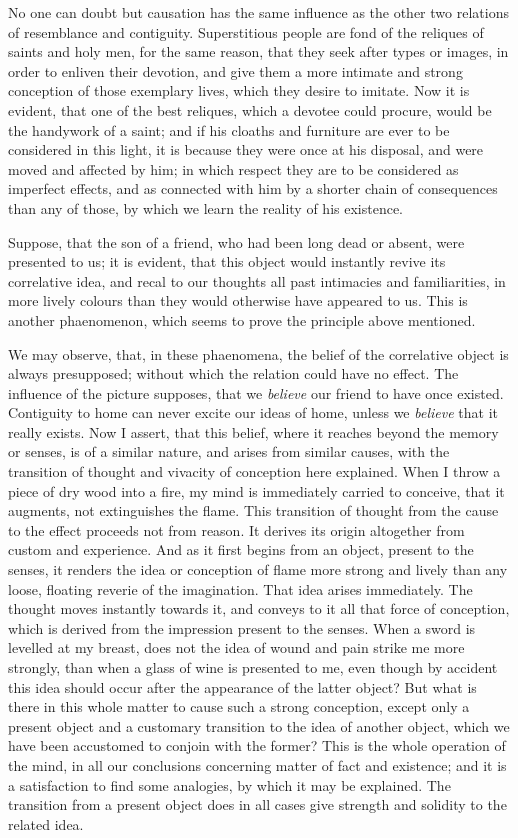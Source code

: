 \documentclass[]{article}
\begin{document}
\begin{sectionbody}
\humeparagraph  No one can doubt but causation has the same influence as the other two relations of resemblance and contiguity. Superstitious people are fond of the reliques of saints and holy men, for the same reason, that they seek after types or images, in order to enliven their devotion, and give them a more intimate and strong conception of those exemplary lives, which they desire to imitate. Now it is evident, that one of the best reliques, which a devotee could procure, would be the handywork of a saint; and if his cloaths and furniture are ever to be considered in this light, it is because they were once at his disposal, and were moved and affected by him; in which respect they are to be considered as imperfect effects, and as connected with him by a shorter chain of consequences than any of those, by which we learn the reality of his existence.

\humeparagraph  Suppose, that the son of a friend, who had been long dead or absent, were presented to us; it is evident, that this object would instantly revive its correlative idea, and recal to our thoughts all past intimacies and familiarities, in more lively colours than they would otherwise have appeared to us. This is another phaenomenon, which seems to prove the principle above mentioned.

\humeparagraph  We may observe, that, in these phaenomena, the belief of the correlative object is always presupposed; without which the relation could have no effect. The influence of the picture supposes, that we \emph{believe} our friend to have once existed. Contiguity to home can never excite our ideas of home, unless we \emph{believe} that it really exists. Now I assert, that this belief, where it reaches beyond the memory or senses, is of a similar nature, and arises from similar causes, with the transition of thought and vivacity of conception here explained. When I throw a piece of dry wood into a fire, my mind is immediately carried to conceive, that it augments, not extinguishes the flame. This transition of thought from the cause to the effect proceeds not from reason. It derives its origin altogether from custom and experience. And as it first begins from an object, present to the senses, it renders the idea or conception of flame more strong and lively than any loose, floating reverie of the imagination. That idea arises immediately. The thought moves instantly towards it, and conveys to it all that force of conception, which is derived from the impression present to the senses. When a sword is levelled at my breast, does not the idea of wound and pain strike me more strongly, than when a glass of wine is presented to me, even though by accident this idea should occur after the appearance of the latter object? But what is there in this whole matter to cause such a strong conception, except only a present object and a customary transition to the idea of another object, which we have been accustomed to conjoin with the former? This is the whole operation of the mind, in all our conclusions concerning matter of fact and existence; and it is a satisfaction to find some analogies, by which it may be explained. The transition from a present object does in all cases give strength and solidity to the related idea.


\end{sectionbody}
\end{document}

